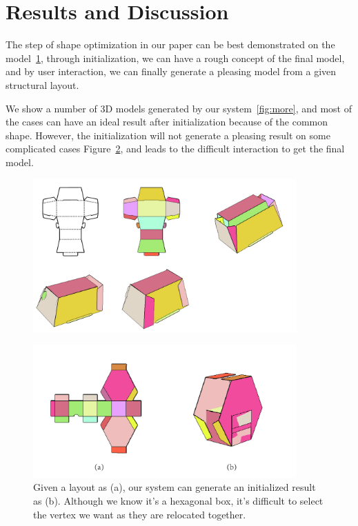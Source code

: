 \documentclass[submission]{gmp2018}
\begin{document}

\section{Results and Discussion}\label{sec:result}
{}

The step of shape optimization in our paper can be best demonstrated on the model~\ref{fig:result}, through initialization, we can have a rough concept of the final model, and by user interaction, we can finally generate a pleasing model from a given structural layout.

We show a number of 3D models generated by our system~\ref{fig:more}, and most of the cases can have an ideal result after initialization because of the common shape. However, the initialization will not generate a pleasing result on some complicated cases Figure~\ref{fig:limitation}, and leads to the difficult interaction to get the final model. 


\begin{figure}
	\centering
	\includegraphics[width=0.9\textwidth]{images/result.jpg}
	\caption{}
	\label{fig:result}
\end{figure}

\begin{figure}
	\centering
	\includegraphics[width=0.9\textwidth]{images/limitation.jpg}
	\caption{Given a layout as (a), our system can generate an initialized result as (b). Although we know it's a hexagonal box, it's difficult to select the vertex we want as they are relocated together.}
	\label{fig:limitation}
\end{figure}
\end{document}
